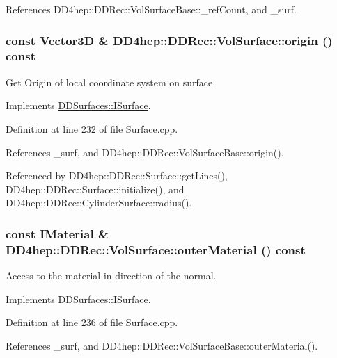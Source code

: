 References DD4hep::DDRec::VolSurfaceBase::\_\-refCount, and \_\-surf.\hypertarget{class_d_d4hep_1_1_d_d_rec_1_1_vol_surface_a4be2b8d1ebddf2ac394a55efc28a2e6e}{
\subsubsection[{origin}]{\setlength{\rightskip}{0pt plus 5cm}const {\bf Vector3D} \& DD4hep::DDRec::VolSurface::origin () const}}
\label{class_d_d4hep_1_1_d_d_rec_1_1_vol_surface_a4be2b8d1ebddf2ac394a55efc28a2e6e}
Get Origin of local coordinate system on surface 

Implements \hyperlink{class_d_d_surfaces_1_1_i_surface_a552cf76ca76154d0a6d9709d826b57f4}{DDSurfaces::ISurface}.

Definition at line 232 of file Surface.cpp.

References \_\-surf, and DD4hep::DDRec::VolSurfaceBase::origin().

Referenced by DD4hep::DDRec::Surface::getLines(), DD4hep::DDRec::Surface::initialize(), and DD4hep::DDRec::CylinderSurface::radius().\hypertarget{class_d_d4hep_1_1_d_d_rec_1_1_vol_surface_a65195963a086380a08fb14762108bad2}{
\subsubsection[{outerMaterial}]{\setlength{\rightskip}{0pt plus 5cm}const {\bf IMaterial} \& DD4hep::DDRec::VolSurface::outerMaterial () const}}
\label{class_d_d4hep_1_1_d_d_rec_1_1_vol_surface_a65195963a086380a08fb14762108bad2}


Access to the material in direction of the normal. 

Implements \hyperlink{class_d_d_surfaces_1_1_i_surface_a49dfd8a5eef419226abc675b8d1126a5}{DDSurfaces::ISurface}.

Definition at line 236 of file Surface.cpp.

References \_\-surf, and DD4hep::DDRec::VolSurfaceBase::outerMaterial().

